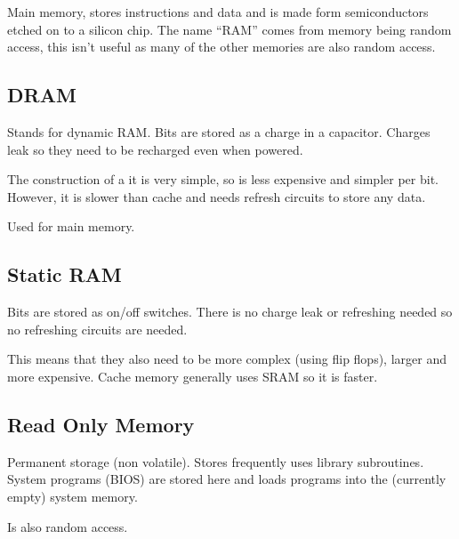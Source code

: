 Main memory, stores instructions and data and is made form semiconductors etched on to a silicon chip.
The name ``RAM'' comes from memory being random access, this isn't useful as many of the other memories are also random access.

\subsection{DRAM}\label{sub:dram}

Stands for dynamic RAM.
Bits are stored as a charge in a capacitor.
Charges leak so they need to be recharged even when powered.

The construction of a it is very simple, so is less expensive and simpler per bit. However, it is slower than cache and needs refresh circuits to store any data.

Used for main memory.

\subsection{Static RAM}\label{sub:static_ram}

Bits are stored as on/off switches.
There is no charge leak or refreshing needed so no refreshing circuits are needed.

This means that they also need to be more complex (using flip flops), larger and more expensive.
Cache memory generally uses SRAM so it is faster.

\subsection{Read Only Memory}\label{sub:read_only_memory}

Permanent storage (non volatile).
Stores frequently uses library subroutines.
System programs (BIOS) are stored here and loads programs into the (currently empty) system memory.

Is also random access.
